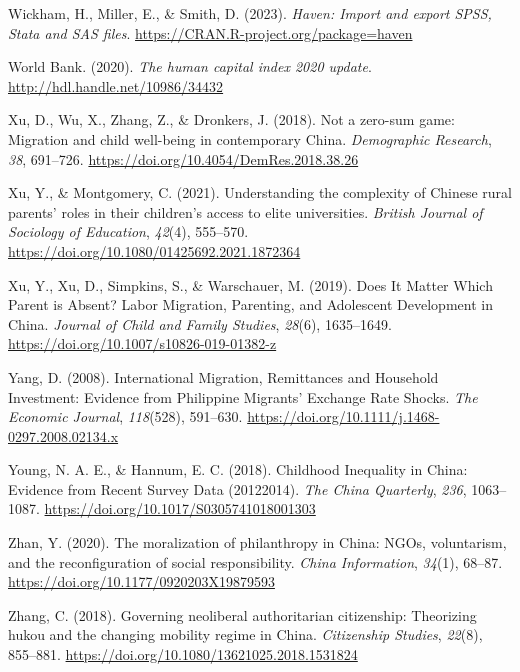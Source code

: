 \documentclass[
  man,floatsintext]{apa7}
\newlength{\cslhangindent}
\newlength{\cslentryspacingunit} %
\newenvironment{CSLReferences}[2] %
 {%
  \setlength{\parindent}{0pt}
  \ifodd #1
  \let\oldpar\par
  \def\par{\hangindent=\cslhangindent\oldpar}
  \fi
  \setlength{\parskip}{#2\cslentryspacingunit}
 }%
 {}
\begin{document}
\begin{CSLReferences}{1}{0}
\leavevmode{}%
Wickham, H., Miller, E., \& Smith, D. (2023). \emph{Haven: Import and export {SPSS}, {Stata} and {SAS} files}. \url{https://CRAN.R-project.org/package=haven}

\leavevmode{}%
World Bank. (2020). \emph{The human capital index 2020 update}. \url{http://hdl.handle.net/10986/34432}

\leavevmode{}%
Xu, D., Wu, X., Zhang, Z., \& Dronkers, J. (2018). Not a zero-sum game: Migration and child well-being in contemporary {China}. \emph{Demographic Research}, \emph{38}, 691--726. \url{https://doi.org/10.4054/DemRes.2018.38.26}

\leavevmode{}%
Xu, Y., \& Montgomery, C. (2021). Understanding the complexity of Chinese rural parents{'} roles in their children{'}s access to elite universities. \emph{British Journal of Sociology of Education}, \emph{42}(4), 555--570. \url{https://doi.org/10.1080/01425692.2021.1872364}

\leavevmode{}%
Xu, Y., Xu, D., Simpkins, S., \& Warschauer, M. (2019). Does It Matter Which Parent is Absent? Labor Migration, Parenting, and Adolescent Development in {China}. \emph{Journal of Child and Family Studies}, \emph{28}(6), 1635--1649. \url{https://doi.org/10.1007/s10826-019-01382-z}

\leavevmode{}%
Yang, D. (2008). International Migration, Remittances and Household Investment: Evidence from Philippine Migrants{'} Exchange Rate Shocks. \emph{The Economic Journal}, \emph{118}(528), 591--630. \url{https://doi.org/10.1111/j.1468-0297.2008.02134.x}

\leavevmode{}%
Young, N. A. E., \& Hannum, E. C. (2018). Childhood Inequality in {China}: Evidence from Recent Survey Data (2012{\textendash}2014). \emph{The {China} Quarterly}, \emph{236}, 1063--1087. \url{https://doi.org/10.1017/S0305741018001303}

\leavevmode{}%
Zhan, Y. (2020). The moralization of philanthropy in {China}: NGOs, voluntarism, and the reconfiguration of social responsibility. \emph{{China} Information}, \emph{34}(1), 68--87. \url{https://doi.org/10.1177/0920203X19879593}

\leavevmode{}%
Zhang, C. (2018). Governing neoliberal authoritarian citizenship: Theorizing hukou and the changing mobility regime in {China}. \emph{Citizenship Studies}, \emph{22}(8), 855--881. \url{https://doi.org/10.1080/13621025.2018.1531824}


\end{CSLReferences}
\end{document}
